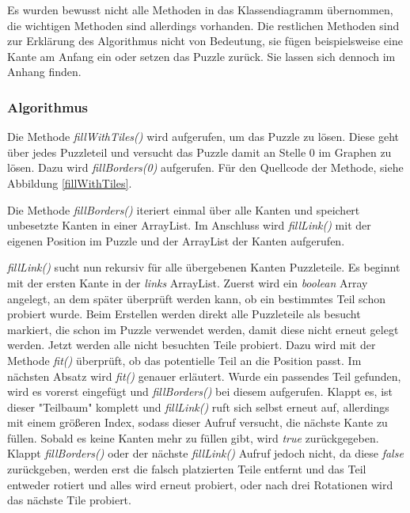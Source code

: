 \documentclass[a4paper, 12pt]{scrartcl}
\begin{document}
Es wurden bewusst nicht alle Methoden in das Klassendiagramm übernommen, die wichtigen Methoden sind allerdings vorhanden. Die restlichen Methoden sind zur Erklärung des Algorithmus nicht von Bedeutung, sie fügen beispielsweise eine Kante am Anfang ein oder setzen das Puzzle zurück. Sie lassen sich dennoch im Anhang finden.

\subsubsection{Algorithmus}

Die Methode \emph{fillWithTiles()} wird aufgerufen, um das Puzzle zu lösen. Diese geht über jedes Puzzleteil und versucht das Puzzle damit an Stelle $0$ im Graphen zu lösen. Dazu wird \emph{fillBorders(0)} aufgerufen. Für den Quellcode der Methode, siehe Abbildung \ref{fillWithTiles}.

Die Methode \emph{fillBorders()} iteriert einmal über alle Kanten und speichert unbesetzte Kanten in einer ArrayList. Im Anschluss wird \emph{fillLink()} mit der eigenen Position im Puzzle und der ArrayList der Kanten aufgerufen. 

\emph{fillLink()} sucht nun rekursiv für alle übergebenen Kanten Puzzleteile. Es beginnt mit der ersten Kante in der \emph{links} ArrayList. Zuerst wird ein \emph{boolean} Array angelegt, an dem später überprüft werden kann, ob ein bestimmtes Teil schon probiert wurde. Beim Erstellen werden direkt alle Puzzleteile als besucht markiert, die schon im Puzzle verwendet werden, damit diese nicht erneut gelegt werden. Jetzt werden alle nicht besuchten Teile probiert. Dazu wird mit der Methode \emph{fit()} überprüft, ob das potentielle Teil an die Position passt. Im nächsten Absatz wird \emph{fit()} genauer erläutert. Wurde ein passendes Teil gefunden, wird es vorerst eingefügt und \emph{fillBorders()} bei diesem aufgerufen. Klappt es, ist dieser "Teilbaum" komplett und \emph{fillLink()} ruft sich selbst erneut auf, allerdings mit einem größeren Index, sodass dieser Aufruf versucht, die nächste Kante zu füllen. Sobald es keine Kanten mehr zu füllen gibt, wird \emph{true} zurückgegeben. Klappt \emph{fillBorders()} oder der nächste \emph{fillLink()} Aufruf jedoch nicht, da diese \emph{false} zurückgeben, werden erst die falsch platzierten Teile entfernt und das Teil entweder rotiert und alles wird erneut probiert, oder nach drei Rotationen wird das nächste Tile probiert.
\end{document}
